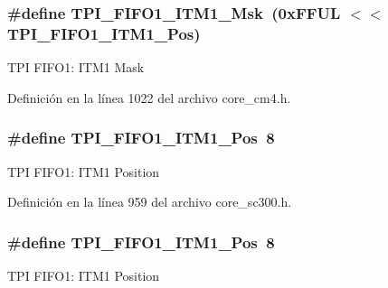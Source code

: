 \subsubsection[{\texorpdfstring{T\+P\+I\+\_\+\+F\+I\+F\+O1\+\_\+\+I\+T\+M1\+\_\+\+Msk}{TPI_FIFO1_ITM1_Msk}}]{\setlength{\rightskip}{0pt plus 5cm}\#define T\+P\+I\+\_\+\+F\+I\+F\+O1\+\_\+\+I\+T\+M1\+\_\+\+Msk~(0x\+F\+F\+U\+L $<$$<$ T\+P\+I\+\_\+\+F\+I\+F\+O1\+\_\+\+I\+T\+M1\+\_\+\+Pos)}\hypertarget{group___c_m_s_i_s___t_p_i_ga3347f42828920dfe56e3130ad319a9e6}{}\label{group___c_m_s_i_s___t_p_i_ga3347f42828920dfe56e3130ad319a9e6}
T\+PI F\+I\+F\+O1\+: I\+T\+M1 Mask 

Definición en la línea 1022 del archivo core\+\_\+cm4.\+h.

\subsubsection[{\texorpdfstring{T\+P\+I\+\_\+\+F\+I\+F\+O1\+\_\+\+I\+T\+M1\+\_\+\+Pos}{TPI_FIFO1_ITM1_Pos}}]{\setlength{\rightskip}{0pt plus 5cm}\#define T\+P\+I\+\_\+\+F\+I\+F\+O1\+\_\+\+I\+T\+M1\+\_\+\+Pos~8}\hypertarget{group___c_m_s_i_s___t_p_i_gaece86ab513bc3d0e0a9dbd82258af49f}{}\label{group___c_m_s_i_s___t_p_i_gaece86ab513bc3d0e0a9dbd82258af49f}
T\+PI F\+I\+F\+O1\+: I\+T\+M1 Position 

Definición en la línea 959 del archivo core\+\_\+sc300.\+h.

\subsubsection[{\texorpdfstring{T\+P\+I\+\_\+\+F\+I\+F\+O1\+\_\+\+I\+T\+M1\+\_\+\+Pos}{TPI_FIFO1_ITM1_Pos}}]{\setlength{\rightskip}{0pt plus 5cm}\#define T\+P\+I\+\_\+\+F\+I\+F\+O1\+\_\+\+I\+T\+M1\+\_\+\+Pos~8}\hypertarget{group___c_m_s_i_s___t_p_i_gaece86ab513bc3d0e0a9dbd82258af49f}{}\label{group___c_m_s_i_s___t_p_i_gaece86ab513bc3d0e0a9dbd82258af49f}
T\+PI F\+I\+F\+O1\+: I\+T\+M1 Position 

